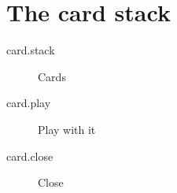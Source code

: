 \section{The card stack}

\begin{description}
  \item[card.stack] Cards
  \item[card.play] Play with it
  \item[card.close] Close
\end{description}

